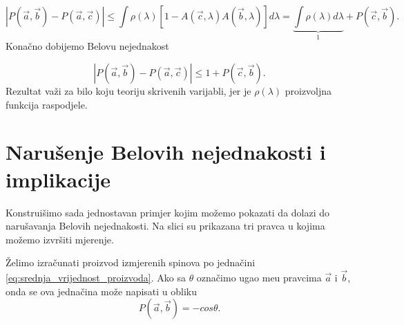 \begin{equation}
    \left|{P(\vec{a}, \vec{b}) - P(\vec{a}, \vec{c})}\right| \le  \int  \rho (\lambda)  [1- A(\vec{c}, \lambda) A(\vec{b}, \lambda)  ]  d\lambda = \underbrace{\int \rho(\lambda)d\lambda}_{1} + P(\vec{c}, \vec{b}).
\end{equation}
Konačno dobijemo Belovu nejednakost

\begin{equation}
    \left|{P(\vec{a}, \vec{b}) - P(\vec{a}, \vec{c})}\right| \le 1 +  P(\vec{c}, \vec{b}).
\end{equation}
Rezultat važi za bilo koju teoriju skrivenih varijabli, jer je $\rho(\lambda)$ proizvoljna funkcija raspodjele.

\section{Narušenje Belovih nejednakosti i implikacije}

Konstruišimo sada jednostavan primjer kojim možemo pokazati da dolazi do narušavanja Belovih nejednakosti. Na slici
su prikazana tri pravca u kojima možemo izvršiti mjerenje.

Želimo izračunati proizvod izmjerenih spinova po jednačini \eqref{eq:srednja_vrijednost_proizvoda}. Ako sa $\theta$ ozna\v cimo ugao me\dj u pravcima $\vec{a}$ i $\vec{b}$, onda se ova jedna\v cina mo\v ze napisati u obliku
\begin{equation}
    P(\vec{a},\vec{b}) = -cos\theta.
\end{equation}\\


\label{fig:detectors_with_chosen_angles}

